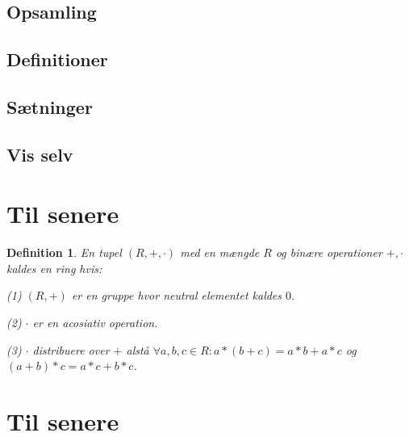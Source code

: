 \documentclass{article}
\newtheorem{defi}{Definition}
\begin{document}
{		\subsection*{Opsamling}
		\subsection*{Definitioner}
		\subsection*{Sætninger}
		\subsection*{Vis selv}
	\section*{Til senere}
		\begin{defi}
			En tupel $(R,+,\cdot)$ med en mængde $R$ og binære operationer $+, \cdot$
			kaldes en ring hvis:

			(1) $(R,+)$ er en gruppe hvor neutral elementet kaldes $0$.

			(2) $\cdot$ er en acosiativ operation.

			(3) $\cdot$ distribuere over $+$ alstå $\forall a,b,c \in R: a*(b+c)=a*b+a*c$
			og $(a+b)*c = a*c+b*c$.
		\end{defi}
	\section*{Til senere}
	}
\end{document}
